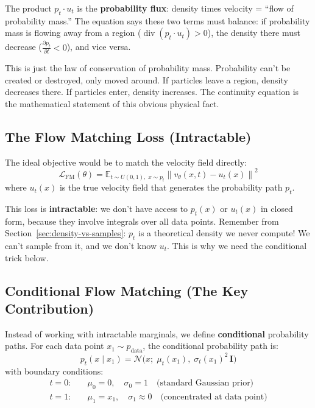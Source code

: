 \documentclass[11pt, a4paper]{article}
\newcommand{\vtheta}{v_\theta}
\newcommand{\E}{\mathbb{E}}
\newcommand{\N}{\mathcal{N}}
\newcommand{\Id}{\mathbf{I}}
\newcommand{\norm}[1]{\left\lVert #1 \right\rVert}
\DeclareMathOperator{\Div}{div}
\begin{document}
The product $p_t \cdot u_t$ is the \textbf{probability flux}: density times
velocity = ``flow of probability mass.''  The equation says these two terms
must balance: if probability mass is flowing away from a region
($\Div(p_t \cdot u_t) > 0$), the density there must decrease
($\frac{\partial p_t}{\partial t} < 0$), and vice versa.

\begin{keyinsight}
This is just the law of conservation of probability mass.
Probability can't be created or destroyed, only moved around.
If particles leave a region, density decreases there.
If particles enter, density increases.
The continuity equation is the mathematical statement of this obvious
physical fact.
\end{keyinsight}

\subsection{The Flow Matching Loss (Intractable)}

The ideal objective would be to match the velocity field directly:
\begin{equation}
  \label{eq:lfm}
  \mathcal{L}_{\mathrm{FM}}(\theta)
  = \E_{t \sim U(0,1),\; x \sim p_t}
    \norm{\vtheta(x, t) - u_t(x)}^2
\end{equation}
where $u_t(x)$ is the true velocity field that generates the probability path
$p_t$.

\begin{warningbox}
This loss is \textbf{intractable}: we don't have access to $p_t(x)$ or
$u_t(x)$ in closed form, because they involve integrals over all data points.
Remember from Section~\ref{sec:density-vs-samples}: $p_t$ is a theoretical
density we never compute!  We can't sample from it, and we don't know $u_t$.
This is why we need the conditional trick below.
\end{warningbox}

\subsection{Conditional Flow Matching (The Key Contribution)}
\label{sec:cfm}

Instead of working with intractable marginals, we define \textbf{conditional}
probability paths.  For each data point $x_1 \sim p_{\mathrm{data}}$, the
conditional probability path is:
\begin{equation}
  \label{eq:cond-path}
  p_t(x \mid x_1) = \N\!\bigl(x;\; \mu_t(x_1),\; \sigma_t(x_1)^2 \,\Id\bigr)
\end{equation}
with boundary conditions:
\begin{align}
  t = 0: &\quad \mu_0 = 0,\quad \sigma_0 = 1
         \quad \text{(standard Gaussian prior)} \\
  t = 1: &\quad \mu_1 = x_1,\quad \sigma_1 \approx 0
         \quad \text{(concentrated at data point)}
\end{align}
\end{document}

